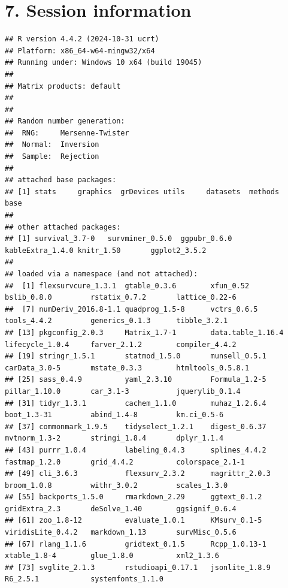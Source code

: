\documentclass[
]{article}
\begin{document}
\clearpage

\section{7. Session information}\label{session-information}

\begin{verbatim}
## R version 4.4.2 (2024-10-31 ucrt)
## Platform: x86_64-w64-mingw32/x64
## Running under: Windows 10 x64 (build 19045)
## 
## Matrix products: default
## 
## 
## Random number generation:
##  RNG:     Mersenne-Twister 
##  Normal:  Inversion 
##  Sample:  Rejection 
##  
## attached base packages:
## [1] stats     graphics  grDevices utils     datasets  methods   base     
## 
## other attached packages:
## [1] survival_3.7-0   survminer_0.5.0  ggpubr_0.6.0     kableExtra_1.4.0 knitr_1.50       ggplot2_3.5.2   
## 
## loaded via a namespace (and not attached):
##  [1] flexsurvcure_1.3.1  gtable_0.3.6        xfun_0.52           bslib_0.8.0         rstatix_0.7.2       lattice_0.22-6     
##  [7] numDeriv_2016.8-1.1 quadprog_1.5-8      vctrs_0.6.5         tools_4.4.2         generics_0.1.3      tibble_3.2.1       
## [13] pkgconfig_2.0.3     Matrix_1.7-1        data.table_1.16.4   lifecycle_1.0.4     farver_2.1.2        compiler_4.4.2     
## [19] stringr_1.5.1       statmod_1.5.0       munsell_0.5.1       carData_3.0-5       mstate_0.3.3        htmltools_0.5.8.1  
## [25] sass_0.4.9          yaml_2.3.10         Formula_1.2-5       pillar_1.10.0       car_3.1-3           jquerylib_0.1.4    
## [31] tidyr_1.3.1         cachem_1.1.0        muhaz_1.2.6.4       boot_1.3-31         abind_1.4-8         km.ci_0.5-6        
## [37] commonmark_1.9.5    tidyselect_1.2.1    digest_0.6.37       mvtnorm_1.3-2       stringi_1.8.4       dplyr_1.1.4        
## [43] purrr_1.0.4         labeling_0.4.3      splines_4.4.2       fastmap_1.2.0       grid_4.4.2          colorspace_2.1-1   
## [49] cli_3.6.3           flexsurv_2.3.2      magrittr_2.0.3      broom_1.0.8         withr_3.0.2         scales_1.3.0       
## [55] backports_1.5.0     rmarkdown_2.29      ggtext_0.1.2        gridExtra_2.3       deSolve_1.40        ggsignif_0.6.4     
## [61] zoo_1.8-12          evaluate_1.0.1      KMsurv_0.1-5        viridisLite_0.4.2   markdown_1.13       survMisc_0.5.6     
## [67] rlang_1.1.6         gridtext_0.1.5      Rcpp_1.0.13-1       xtable_1.8-4        glue_1.8.0          xml2_1.3.6         
## [73] svglite_2.1.3       rstudioapi_0.17.1   jsonlite_1.8.9      R6_2.5.1            systemfonts_1.1.0
\end{verbatim}
\end{document}
